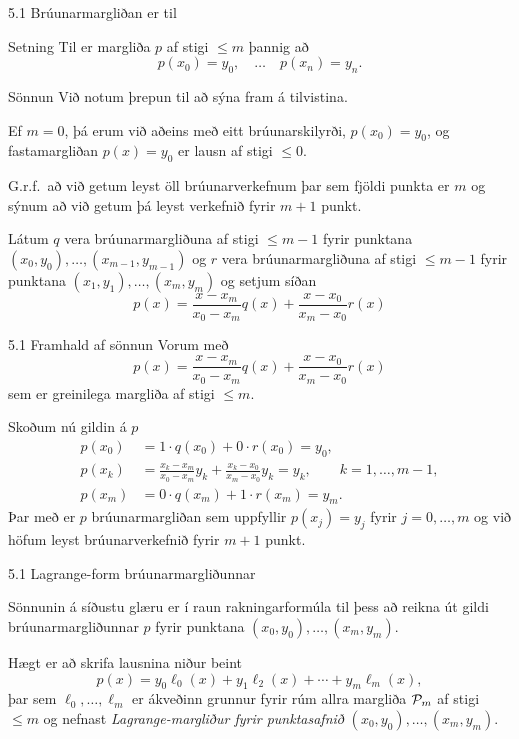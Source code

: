 \begin{frame}{5.1 Brúunarmargliðan er til} 

\begin{block}{Setning}
 Til er margliða $p$ af stigi $\leq m$ þannig að 
 $$
  p(x_0) = y_0, \quad \ldots \quad p(x_n)=y_n.
  $$
\end{block}
\pause
\begin{block}{Sönnun}
 Við notum þrepun til að sýna fram á tilvistina. 

\pause
Ef $m = 0$, þá erum 
við aðeins með eitt brúunarskilyrði, $p(x_0) = y_0$, og
fastamargliðan  $p(x) = y_0$ er lausn af stigi $\leq 0$.

\pause
\smallskip
G.r.f.~að við getum leyst öll brúunarverkefnum 
þar sem fjöldi punkta er $m$ og sýnum að við getum þá leyst verkefnið
fyrir $m+1$ punkt. 

\pause
\smallskip
Látum $q$ vera brúunarmargliðuna 
af stigi $\leq m-1$ fyrir punktana $(x_0,y_0), \ldots,
(x_{m-1},y_{m-1})$  og $r$ vera  brúunarmargliðuna af stigi $\leq m-1$
fyrir punktana $(x_1,y_1), \ldots, (x_m,y_m)$ og setjum síðan
\begin{equation*}
  p(x) = \frac{x-x_m}{x_0-x_m}q(x) + \frac{x-x_0}{x_m-x_0}r(x)
\end{equation*}
\end{block}
\end{frame}

\begin{frame}{5.1 Framhald af sönnun}
Vorum með 
\begin{equation*}
  p(x) = \frac{x-x_m}{x_0-x_m}q(x) + \frac{x-x_0}{x_m-x_0}r(x)
\end{equation*}
sem er greinilega margliða af stigi $\leq m$.
\pause

Skoðum nú gildin á $p$
\begin{align*}
  p(x_0) &= 1 \cdot q(x_0) + 0\cdot r(x_0) = y_0, \\
  p(x_k) &= \frac{x_k-x_m}{x_0-x_m}y_k 
  + \frac{x_k-x_0}{x_m-x_0}y_k = y_k,\qquad k = 1, \ldots, m-1,\\
  p(x_m) &= 0 \cdot q(x_m) + 1 \cdot r(x_m) = y_m.
\end{align*}\pause
Þar með er $p$ brúunarmargliðan sem uppfyllir $p(x_j)=y_j$ fyrir 
$j=0,\dots,m$ og við höfum leyst brúunarverkefnið fyrir $m+1$ punkt.
\end{frame}

\begin{frame}{5.1 Lagrange-form brúunarmargliðunnar} 

Sönnunin á síðustu glæru er í raun rakningarformúla til þess að reikna
út gildi brúunarmargliðunnar $p$ fyrir punktana
$(x_0,y_0),\dots,(x_m,y_m)$. 

\pause
\smallskip
Hægt er að skrifa lausnina niður beint 
$$
p(x)=y_0\ell_0(x)+y_1\ell_2(x)+\cdots+y_m\ell_m(x),
$$  
þar sem $\ell_0,\dots,\ell_m$ er ákveðinn grunnur fyrir rúm allra
margliða ${\cal P}_m$ af stigi $\leq m$ og nefnast {\it
  Lagrange-margliður  fyrir punktasafnið} $(x_0,y_0),\dots,(x_m,y_m)$.
\end{frame}

